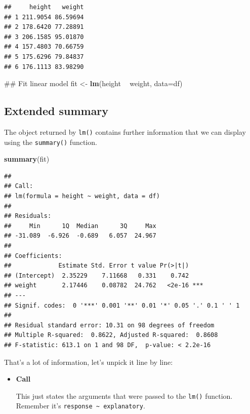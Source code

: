 \documentclass[]{book}
\newenvironment{Shaded}{\begin{snugshade}}{\end{snugshade}}
\newcommand{\KeywordTok}[1]{\textcolor[rgb]{0.13,0.29,0.53}{\textbf{#1}}}
\newcommand{\DataTypeTok}[1]{\textcolor[rgb]{0.13,0.29,0.53}{#1}}
\newcommand{\StringTok}[1]{\textcolor[rgb]{0.31,0.60,0.02}{#1}}
\newcommand{\OperatorTok}[1]{\textcolor[rgb]{0.81,0.36,0.00}{\textbf{#1}}}
\newcommand{\NormalTok}[1]{#1}
\theoremstyle{definition}
\theoremstyle{definition}
\theoremstyle{definition}
\theoremstyle{remark}
\begin{document}
\begin{verbatim}
##     height   weight
## 1 211.9054 86.59694
## 2 178.6420 77.28891
## 3 206.1585 95.01870
## 4 157.4803 70.66759
## 5 175.6296 79.84837
## 6 176.1113 83.98290
\end{verbatim}

\begin{Shaded}
\begin{Highlighting}[]
\NormalTok{## Fit linear model}
\NormalTok{fit <-}\StringTok{ }\KeywordTok{lm}\NormalTok{(height }\OperatorTok{~}\StringTok{ }\NormalTok{weight, }\DataTypeTok{data=}\NormalTok{df)}
\end{Highlighting}
\end{Shaded}

\subsection{Extended summary}\label{extended-summary}

The object returned by \texttt{lm()} contains further information that
we can display using the \texttt{summary()} function.

\begin{Shaded}
\begin{Highlighting}[]
\KeywordTok{summary}\NormalTok{(fit)}
\end{Highlighting}
\end{Shaded}

\begin{verbatim}
## 
## Call:
## lm(formula = height ~ weight, data = df)
## 
## Residuals:
##     Min      1Q  Median      3Q     Max 
## -31.089  -6.926  -0.689   6.057  24.967 
## 
## Coefficients:
##             Estimate Std. Error t value Pr(>|t|)    
## (Intercept)  2.35229    7.11668   0.331    0.742    
## weight       2.17446    0.08782  24.762   <2e-16 ***
## ---
## Signif. codes:  0 '***' 0.001 '**' 0.01 '*' 0.05 '.' 0.1 ' ' 1
## 
## Residual standard error: 10.31 on 98 degrees of freedom
## Multiple R-squared:  0.8622, Adjusted R-squared:  0.8608 
## F-statistic: 613.1 on 1 and 98 DF,  p-value: < 2.2e-16
\end{verbatim}

That's a lot of information, let's unpick it line by line:

\begin{itemize}
\item
  \textbf{Call}

  This just states the arguments that were passed to the \texttt{lm()}
  function. Remember it's
  \texttt{response\ \textasciitilde{}\ explanatory}.
\end{itemize}
\end{document}
